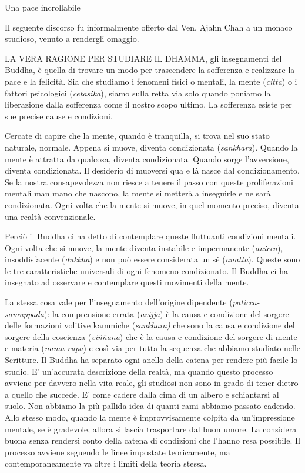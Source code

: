 Una pace incrollabile

Il seguente discorso fu informalmente offerto dal Ven. Ajahn Chah a un
monaco studioso, venuto a rendergli omaggio.

LA VERA RAGIONE PER STUDIARE IL DHAMMA, gli insegnamenti del Buddha, è
quella di trovare un modo per trascendere la sofferenza e realizzare la
pace e la felicità. Sia che studiamo i fenomeni fisici o mentali, la
mente (\emph{citta}) o i fattori psicologici (\emph{cetasika}), siamo
sulla retta via solo quando poniamo la liberazione dalla sofferenza come
il nostro scopo ultimo. La sofferenza esiste per sue precise cause e
condizioni.

Cercate di capire che la mente, quando è tranquilla, si trova nel suo
stato naturale, normale. Appena si muove, diventa condizionata
(\emph{sankhara}). Quando la mente è attratta da qualcosa, diventa
condizionata. Quando sorge l'avversione, diventa condizionata. Il
desiderio di muoversi qua e là nasce dal condizionamento. Se la nostra
consapevolezza non riesce a tenere il passo con queste proliferazioni
mentali man mano che nascono, la mente si metterà a inseguirle e ne sarà
condizionata. Ogni volta che la mente si muove, in quel momento preciso,
diventa una realtà convenzionale.~

Perciò il Buddha ci ha detto di contemplare queste fluttuanti condizioni
mentali. Ogni volta che si muove, la mente diventa instabile e
impermanente (\emph{anicca}), insoddisfacente (\emph{dukkha}) e non può
essere considerata un sé (\emph{anatta}). Queste sono le tre
caratteristiche universali di ogni fenomeno condizionato. Il Buddha ci
ha insegnato ad osservare e contemplare questi movimenti della mente.

La stessa cosa vale per l'insegnamento dell'origine dipendente
(\emph{paticca-samuppada}): la comprensione errata (\emph{avijja}) è la
causa e condizione del sorgere delle formazioni volitive kammiche
(\emph{sankhara)} che sono la causa e condizione del sorgere della
coscienza (\emph{viññana}) che è la causa e condizione del sorgere di
mente e materia (\emph{nama-rupa}) e così via per tutta la sequenza che
abbiamo studiato nelle Scritture. Il Buddha ha separato ogni anello
della catena per rendere più facile lo studio. E' un'accurata
descrizione della realtà, ma quando questo processo avviene per davvero
nella vita reale, gli studiosi non sono in grado di tener dietro a
quello che succede. E' come cadere dalla cima di un albero e schiantarsi
al suolo. Non abbiamo la più pallida idea di quanti rami abbiamo passato
cadendo. Allo stesso modo, quando la mente è improvvisamente colpita da
un'impressione mentale, se è gradevole, allora si lascia trasportare dal
buon umore. La considera buona senza rendersi conto della catena di
condizioni che l'hanno resa possibile. Il processo avviene seguendo le
linee impostate teoricamente, ma contemporaneamente va oltre i limiti
della teoria stessa.

